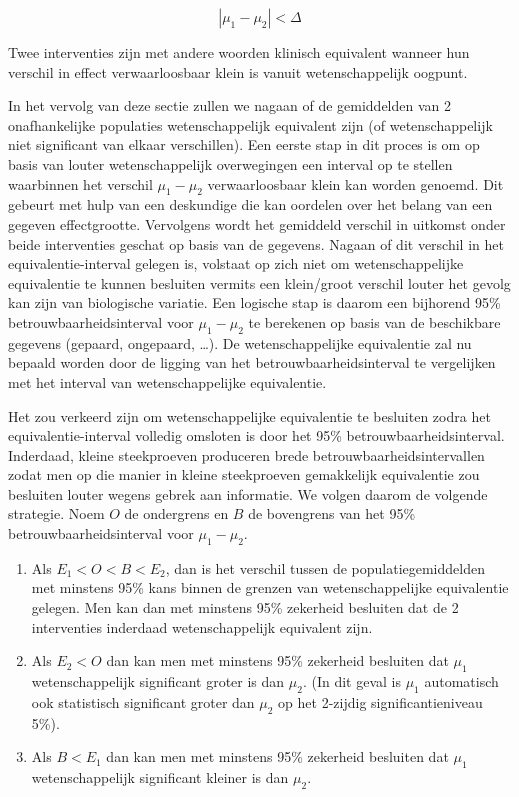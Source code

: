 \documentclass[
  12pt,dutch,coursenotes]{book}
\theoremstyle{definition}
\theoremstyle{definition}
\theoremstyle{definition}
\theoremstyle{definition}
\theoremstyle{remark}
\begin{document}
\begin{equation*}
|\mu_1 - \mu_2| < \Delta
\end{equation*}

Twee interventies zijn met andere woorden klinisch equivalent
wanneer hun verschil in effect verwaarloosbaar klein is vanuit wetenschappelijk
oogpunt.

In het vervolg van deze sectie zullen we nagaan of de gemiddelden van 2 onafhankelijke
populaties wetenschappelijk equivalent zijn (of wetenschappelijk niet significant van elkaar
verschillen). Een eerste stap in dit proces is om op basis van louter
wetenschappelijk overwegingen een interval op te stellen waarbinnen het verschil \(\mu_1-\mu_2\) verwaarloosbaar klein kan worden genoemd. Dit gebeurt met hulp van een deskundige die kan oordelen over het belang van een gegeven
effectgrootte. Vervolgens wordt het gemiddeld verschil in uitkomst onder
beide interventies geschat op basis van de gegevens. Nagaan of dit verschil
in het equivalentie-interval gelegen is, volstaat op zich niet om wetenschappelijke
equivalentie te kunnen besluiten vermits een klein/groot verschil louter
het gevolg kan zijn van biologische variatie. Een logische stap is daarom
een bijhorend 95\% betrouwbaarheidsinterval voor \(\mu_1 - \mu_2\) te berekenen op basis van de beschikbare gegevens (gepaard, ongepaard, \ldots). De wetenschappelijke equivalentie zal nu bepaald worden door de ligging van het
betrouwbaarheidsinterval te vergelijken met het interval van wetenschappelijke
equivalentie.

Het zou verkeerd zijn om wetenschappelijke equivalentie te besluiten zodra het
equivalentie-interval volledig omsloten is door het 95\%
betrouwbaarheidsinterval. Inderdaad, kleine steekproeven produceren brede
betrouwbaarheidsintervallen zodat men op die manier in kleine steekproeven
gemakkelijk equivalentie zou besluiten louter wegens gebrek aan
informatie. We volgen daarom de volgende strategie. Noem \(O\) de ondergrens
en \(B\) de bovengrens van het 95\% betrouwbaarheidsinterval voor \(\mu_1-\mu_2\).

\begin{enumerate}
\def\labelenumi{\arabic{enumi}.}
\item
  Als \(E_1 < O < B < E_2\), dan is het verschil tussen de populatiegemiddelden met minstens 95\% kans binnen de grenzen van wetenschappelijke equivalentie gelegen. Men kan dan met minstens 95\% zekerheid besluiten dat de 2 interventies inderdaad wetenschappelijk equivalent zijn.
\item
  Als \(E_2 < O\) dan kan men met minstens 95\% zekerheid besluiten dat \(\mu_1\) wetenschappelijk significant groter is dan \(\mu_2\). (In dit geval is \(\mu_1\) automatisch ook statistisch significant groter dan \(\mu_2\) op het 2-zijdig significantieniveau 5\%).
\item
  Als \(B < E_1\) dan kan men met minstens 95\% zekerheid besluiten dat \(\mu_1\) wetenschappelijk significant kleiner is dan \(\mu_2.\)
\end{enumerate}
\end{document}
